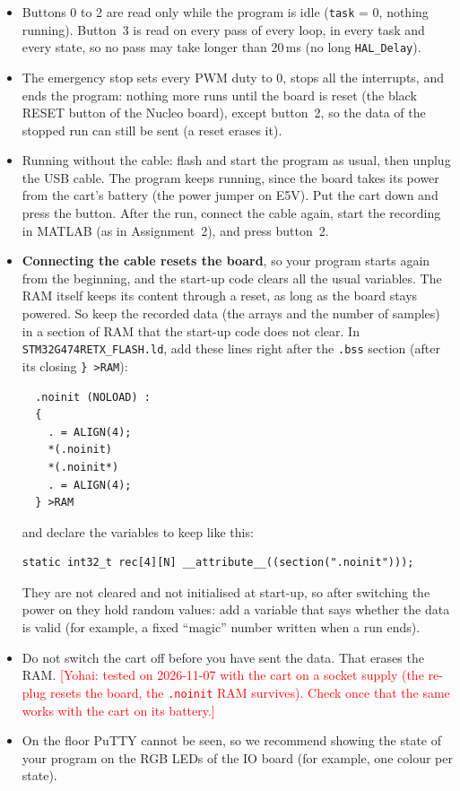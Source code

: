 \documentclass[11pt,a4paper]{article}
\newcommand{\flag}[1]{\textcolor{red}{[#1]}}
\begin{document}
\begin{itemize}
  \item Buttons 0 to 2 are read only while the program is idle (\texttt{task} = 0, nothing running). Button~3 is read
        on every pass of every loop, in every task and every state, so no pass may take longer than 20\,ms (no long
        \texttt{HAL\_Delay}).
  \item The emergency stop sets every PWM duty to 0, stops all the interrupts, and ends the program: nothing more runs
        until the board is reset (the black RESET button of the Nucleo board), except button~2, so the data of the
        stopped run can still be sent (a reset erases it).
  \item Running without the cable: flash and start the program as usual, then unplug the USB cable. The program keeps
        running, since the board takes its power from the cart's battery (the power jumper on E5V). Put the cart down
        and press the button. After the run, connect the cable again, start the recording in MATLAB (as in
        Assignment~2), and press button~2.
  \item \textbf{Connecting the cable resets the board}, so your program starts again from the beginning, and the
        start-up code clears all the usual variables. The RAM itself keeps its content through a reset, as long as the
        board stays powered. So keep the recorded data (the arrays and the number of samples) in a section of RAM that the
        start-up code does not clear. In \texttt{STM32G474RETX\_FLASH.ld}, add these lines right after the
        \texttt{.bss} section (after its closing \texttt{\} >RAM}):
\begin{lstlisting}
  .noinit (NOLOAD) :
  {
    . = ALIGN(4);
    *(.noinit)
    *(.noinit*)
    . = ALIGN(4);
  } >RAM
\end{lstlisting}
        and declare the variables to keep like this:
\begin{lstlisting}
static int32_t rec[4][N] __attribute__((section(".noinit")));
\end{lstlisting}
        They are not cleared and not
        initialised at start-up, so after switching the power on they hold random values: add a variable that says
        whether the data is valid (for example, a fixed ``magic'' number written when a run ends).
  \item Do not switch the cart off before you have sent the data. That erases the RAM.
        \flag{Yohai: tested on 2026-11-07 with the cart on a socket supply (the re-plug resets the board, the
        \texttt{.noinit} RAM survives). Check once that the same works with the cart on its battery.}
  \item On the floor PuTTY cannot be seen, so we recommend showing the state of your program on the RGB LEDs of the
        IO board (for example, one colour per state).
\end{itemize}
\end{document}
